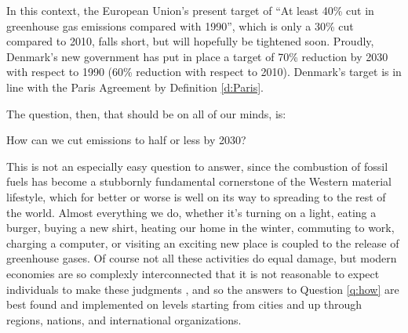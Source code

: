 In this context, the European Union's present target of ``At least 40\% cut in greenhouse gas emissions compared with 1990''\cite{EC_2030}, which is only a 30\% cut compared to 2010\cite{Ritchie2019a}, falls short, but will hopefully be tightened soon. Proudly, Denmark's new government has put in place a target of 70\% reduction by 2030 with respect to 1990 (60\% reduction with respect to 2010)\cite{CHN_70p}. Denmark's target is in line with the Paris Agreement by Definition \ref{d:Paris}. 



The question, then, that should be on all of our minds, is:

\begin{question}
How can we cut emissions to half or less by 2030? \label{q:how}
\end{question}

This is not an especially easy question to answer, since the combustion of fossil fuels has become a stubbornly fundamental cornerstone of the Western material lifestyle, which for better or worse is well on its way to spreading to the rest of the world. Almost everything we do, whether it's turning on a light, eating a burger, buying a new shirt, heating our home in the winter, commuting to work, charging a computer, or visiting an exciting new place is coupled to the release of greenhouse gases. Of course not all these activities do equal damage, but modern economies are so complexly interconnected that it is not reasonable to expect individuals to make these judgments
, and so
the answers to Question \ref{q:how} are best found and implemented on levels starting from cities and up through regions, nations, and international organizations.

